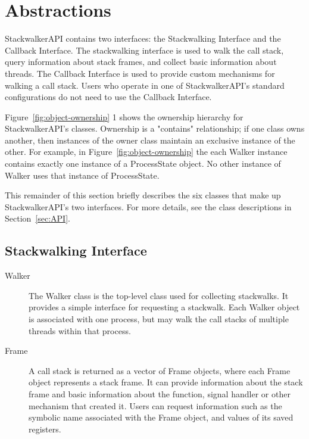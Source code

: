 \section{Abstractions}
\label{sec:abstractions}

StackwalkerAPI contains two interfaces: the Stackwalking Interface and the
Callback Interface. The stackwalking interface is used to walk the call stack,
query information about stack frames, and collect basic information about
threads. The Callback Interface is used to provide custom mechanisms for walking
a call stack. Users who operate in one of StackwalkerAPI's standard
configurations do not need to use the Callback Interface. 
    
Figure~\ref{fig:object-ownership} 1 shows the ownership hierarchy for
StackwalkerAPI's classes. Ownership is a "contains" relationship; if one class
owns another, then instances of the owner class maintain an exclusive instance
of the other. For example, in Figure~\ref{fig:object-ownership} the each Walker
instance contains exactly one instance of a ProcessState object.  No other
instance of Walker uses that instance of ProcessState.  

This remainder of this
section briefly describes the six classes that make up StackwalkerAPI's two
interfaces. For more details, see the class descriptions in
Section~\ref{sec:API}.



\subsection{Stackwalking Interface}
\begin{description}
    \item [Walker] The Walker class is the top-level class used for collecting
        stackwalks. It provides a simple interface for requesting a stackwalk.
        Each Walker object is associated with one process, but may walk the call
        stacks of multiple threads within that process.
    \item [Frame] A call stack is returned as a vector of Frame objects, where
        each Frame object represents a stack frame. It can provide information
        about the stack frame and basic information about the function, signal
        handler or other mechanism that created it. Users can request
        information such as the symbolic name associated with the Frame object,
        and values of its saved registers. 
\end{description}

